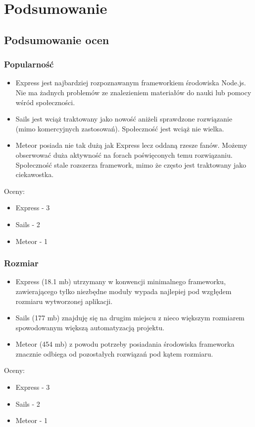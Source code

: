 \documentclass[12pt]{report}
\begin{document}
\chapter{Podsumowanie}
  \section{Podsumowanie ocen}
    \subsection{Popularność}
      \begin{itemize}
        \item Express jest najbardziej rozpoznawanym frameworkiem środowiska Node.js. Nie ma żadnych problemów ze znalezieniem materiałów do nauki lub pomocy wśród społeczności.
        \item Sails jest wciąż traktowany jako nowość aniżeli sprawdzone rozwiązanie (mimo komercyjnych zastosowań). Społeczność jest wciąż nie wielka.
        \item Meteor posiada nie tak dużą jak Express lecz oddaną rzesze fanów. Możemy obserwować duża aktywność na forach poświęconych temu rozwiązaniu. Społeczność stale rozszerza framework, mimo że często jest traktowany jako ciekawostka. 
      \end{itemize}
      Oceny:
      \begin{itemize}
        \item Express - 3
        \item Sails - 2
        \item Meteor - 1
      \end{itemize}

    \subsection{Rozmiar}
      \begin{itemize}
        \item Express (18.1 mb) utrzymany w konwencji minimalnego frameworku, zawierającego tylko niezbędne moduły wypada najlepiej pod wzgłędem rozmiaru wytworzonej aplikacji.
        \item Sails (177 mb) znajduję się na drugim miejscu z nieco większym rozmiarem spowodowanym większą automatyzacją projektu.
        \item Meteor (454 mb) z powodu potrzeby posiadania środowiska frameworka znacznie odbiega od pozostałych rozwiązań pod kątem rozmiaru.
      \end{itemize}
      Oceny:
      \begin{itemize}
        \item Express - 3
        \item Sails - 2
        \item Meteor - 1
      \end{itemize}
      
\end{document}
